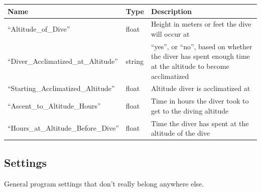 \documentclass[12pt]{article}
\begin{document}
\begin{longtable}{|l|l|p{5cm}|}
\hline
 Name                                   &  Type    &  Description                                                                                                  \\
\hline
 ``Altitude\_of\_Dive''                 &  float   &  Height in meters or feet the dive will occur at                                                              \\
\hline
 ``Diver\_Acclimatized\_at\_Altitude''  &  string  &  ``yes'', or ``no'', based on whether the diver has spent enough time at the altitude to become acclimatized  \\
\hline
 ``Starting\_Acclimatized\_Altitude''   &  float   &  Altitude diver is acclimatized at                                                                            \\
\hline
 ``Ascent\_to\_Altitude\_Hours''        &  float   &  Time in hours the diver took to get to the diving altitude                                                   \\
\hline
 ``Hours\_at\_Altitude\_Before\_Dive''  &  float   &  Time the diver has spent at the altitude of the dive                                                         \\
\hline
\end{longtable}


\subsection{Settings}

General program settings that don't really belong anywhere else.
\end{document}
